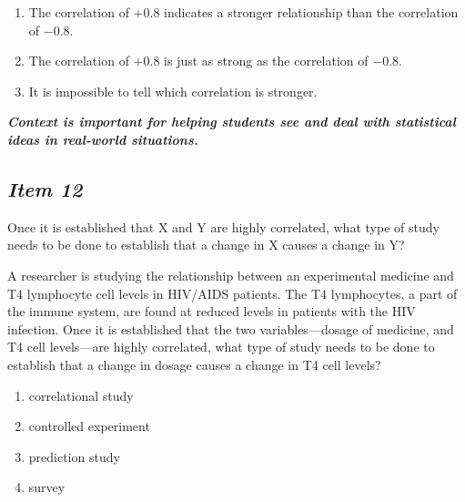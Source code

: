 \begin{enumerate} [leftmargin=2cm, itemsep=.2em]


\item The correlation of $+0.8$ indicates a stronger relationship than the correlation of $-0.8$.


\item The correlation of $+0.8$ is just as strong as the correlation of $-0.8$.


\item It is impossible to tell which correlation is stronger.


\end{enumerate}





\noindent \textbf{\textit{Context is important for helping students see and deal with statistical ideas in real-world situations.}}





\subsection{\textbf{\textit{Item 12}}}


Once it is established that X and Y are highly correlated, what type of study needs to be done to establish that a change in X causes a change in Y?\\





\vspace{8pt}


\noindent{}





A researcher is studying the relationship between an experimental medicine and T4 lymphocyte cell levels in HIV/AIDS patients. The T4 lymphocytes, a part of the immune system, are found at reduced levels in patients with the HIV infection. Once it is established that the two variables---dosage of medicine, and T4 cell levels---are highly correlated, what type of study needs to be done to establish that a change in dosage causes a change in T4 cell levels? 


\begin{enumerate} [leftmargin=2cm, itemsep=.2em]


\item correlational study


\item controlled experiment


\item prediction study


\item survey


\end{enumerate}





